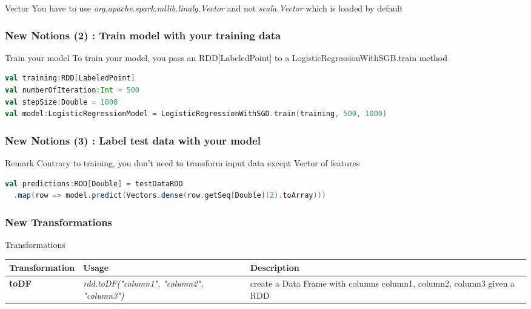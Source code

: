 \documentclass[slidetop,9pt,utf8]{beamer}
\begin{document}
\begin{CJK}{UTF8}{gbsn}
\begin{frame}[fragile]
\begin{alertblock}{Vector}
  You have to use \textit{org.apache.spark.mllib.linalg.Vector} and not \textit{scala.Vector} which is loaded by default
\end{alertblock}

\end{frame}

\begin{frame}[fragile]
  \frametitle{New Notions (2) : Train model with your training data}

  \begin{block}{Train your model}
    To train your model, you pass an RDD[LabeledPoint] to a LogisticRegressionWithSGB.train method
  \end{block}

  \begin{lstlisting}[label=TrainModel, caption=Train your model, language=scala, style=code]
val training:RDD[LabeledPoint]
val numberOfIteration:Int = 500
val stepSize:Double = 1000
val model:LogisticRegressionModel = LogisticRegressionWithSGD.train(training, 500, 1000)
  \end{lstlisting}


\end{frame}

\begin{frame}[fragile]
  \frametitle{New Notions (3) : Label test data with your model}

  \begin{block}{Remark}
    Contrary to training, you don't need to transform input data except Vector of features
  \end{block}

  \begin{lstlisting}[label=TransformDataToLinearRegression, caption=Transform row into LabeledPoint, language=scala, style=code]
val predictions:RDD[Double] = testDataRDD
  .map(row => model.predict(Vectors.dense(row.getSeq[Double](2).toArray)))
  \end{lstlisting}

\end{frame}

\begin{frame}

  \frametitle{New Transformations}

  \begin{block}{Transformations}
    \begin{center}
      \begin{tabular}{|m{2.1cm}|m{3.5cm}|m{5cm}|}
        \hline 
        \rowcolor{gray} \textbf{Transformation} & \textbf{Usage} & \textbf{Description} \\ \hline
        \textbf{toDF} & \textit{rdd.toDF("column1", "column2", "column3")} & create a Data Frame with columns column1, column2, column3 given a RDD \\ \hline
      \end{tabular}
    \end{center}
  \end{block}


\end{frame}
\end{CJK}
\end{document}
